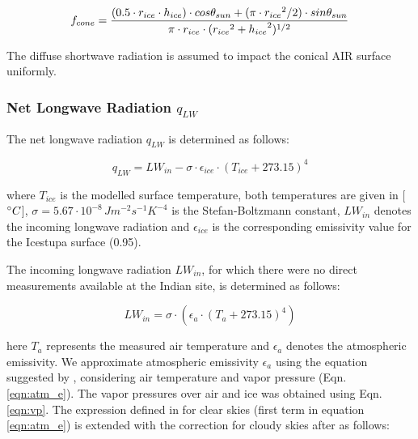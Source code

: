 \documentclass[utf8]{frontiersSCNS} %
\begin{document}
\begin{equation} \begin{split} f_{cone}& =\frac{(0.5 \cdot r_{ice} \cdot h_{ice}) \cdot cos \theta_{sun} +(\pi \cdot
			{r_{ice}}^2/2) \cdot sin \theta_{sun} }{\pi \cdot r_{ice} \cdot ({r_{ice}}^2+{h_{ice}}^2)^{1/2}}\\ \end{split}
	\label{eqn:f_{cone}} \end{equation}

The diffuse shortwave radiation is assumed to impact the conical AIR surface uniformly.

\subsubsection{Net Longwave Radiation \texorpdfstring{$q_{LW}$}{Lg}}

The net longwave radiation $q_{LW}$ is determined as follows:

\begin{equation} q_{LW}= LW_{in}-\sigma \cdot \epsilon_{ice} \cdot {(T_{ice}+ 273.15)}^4
	\label{eqn:LW} \end{equation}

where $T_{ice}$ is the modelled surface temperature, both temperatures are given in [$\degree C$], $\sigma=5.67\cdot
	10^{-8}\,Jm^{-2}s^{-1}K^{-4}$ is the Stefan-Boltzmann constant, $LW_{in}$ denotes the incoming longwave radiation and
$\epsilon_{ice}$ is the corresponding emissivity value for the Icestupa surface (0.95).

The incoming longwave radiation $LW_{in}$, for which there were no direct measurements available at the Indian site, is determined
as follows:

\begin{equation} LW_{in}=\sigma \cdot (\epsilon_a \cdot {(T_a+ 273.15)}^4)
	\label{eqn:LWin} \end{equation}

here  $T_a$ represents the measured air temperature and $\epsilon_a$ denotes the atmospheric emissivity. We approximate atmospheric emissivity $\epsilon_a$ using the
equation suggested by \cite{Brutsaert_1982}, considering air temperature and vapor pressure (Eqn.  \ref{eqn:atm_e}). The
vapor pressures over air and ice was obtained using Eqn. \ref{eqn:vp}.  The expression defined in \cite{Brutsaert_1975}
for clear skies (first term in equation \ref{eqn:atm_e}) is extended with the correction for cloudy skies after
\cite{Brutsaert_1982} as follows:
\end{document}
